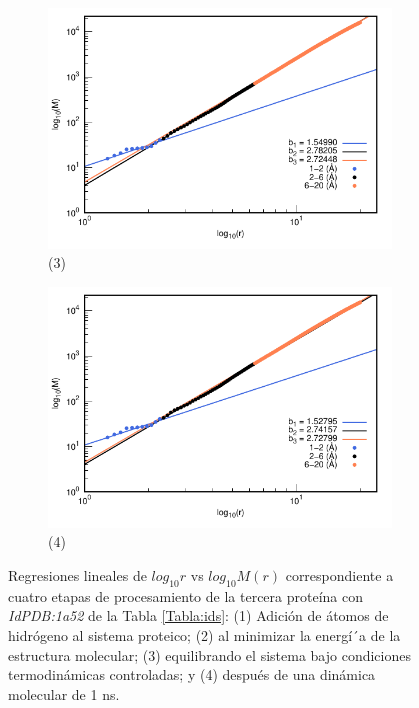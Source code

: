 \begin{figure}[H]
			\vspace{0cm} %
			
			\hspace{-0.3cm} 
			\begin{subfigure}{0.49\textwidth}
				\centering
				\includegraphics[width=\linewidth,page=1]{graphs/PDBs/1a52/1a52Eq.pdf}
				\caption{(3)}
			\end{subfigure}
			\hspace{0.2cm}
			\begin{subfigure}{0.49\textwidth} %
				\centering
				\includegraphics[width=\linewidth,page=1]{graphs/PDBs/1a52/1a521ns.pdf}
				\caption{(4)}
			\end{subfigure}
			\caption{Regresiones lineales de $log_{10}r$ vs $log_{10}M(r)$ correspondiente a cuatro etapas de procesamiento de la tercera prote\'{i}na con \textit{IdPDB:1a52} de la Tabla \ref{Tabla:ids}: (1) Adici\'{o}n de \'{a}tomos de hidr\'{o}geno al sistema proteico; (2) al minimizar la energ\'{i´}a de la estructura molecular; (3) equilibrando el sistema bajo condiciones termodin\'{a}micas controladas; y (4) despu\'{e}s de una din\'{a}mica molecular de 1 ns.}
			\label{fig:1a52}
		\end{figure}
		
